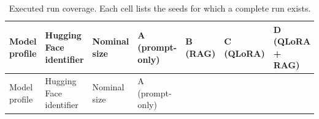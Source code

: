 \begin{landscape}
\begingroup\scriptsize\setlength{\tabcolsep}{1pt}\sloppy
\begin{longtable}[]{@{}
  >{\raggedright\arraybackslash}p{}
  >{\raggedright\arraybackslash}p{}
  >{\raggedleft\arraybackslash}p{}
  >{\raggedright\arraybackslash}p{}
  >{\raggedright\arraybackslash}p{}
  >{\raggedright\arraybackslash}p{}
  >{\raggedright\arraybackslash}p{}@{}}
\caption{Executed run coverage. Each cell lists the seeds for which a complete run exists.}\tabularnewline
\toprule\noalign{}
\begin{minipage}[b]{\linewidth}\raggedright
Model profile
\end{minipage} & \begin{minipage}[b]{\linewidth}\raggedright
Hugging Face identifier
\end{minipage} & \begin{minipage}[b]{\linewidth}\raggedleft
Nominal size
\end{minipage} & \begin{minipage}[b]{\linewidth}\raggedright
A (prompt-only)
\end{minipage} & \begin{minipage}[b]{\linewidth}\raggedright
B (RAG)
\end{minipage} & \begin{minipage}[b]{\linewidth}\raggedright
C (QLoRA)
\end{minipage} & \begin{minipage}[b]{\linewidth}\raggedright
D (QLoRA + RAG)
\end{minipage} \\
\midrule\noalign{}
\endfirsthead
\toprule\noalign{}
\begin{minipage}[b]{\linewidth}\raggedright
Model profile
\end{minipage} & \begin{minipage}[b]{\linewidth}\raggedright
Hugging Face identifier
\end{minipage} & \begin{minipage}[b]{\linewidth}\raggedleft
Nominal size
\end{minipage} & \begin{minipage}[b]{\linewidth}\raggedright
A (prompt-only)

\end{minipage}
\end{longtable}
\end{landscape}
